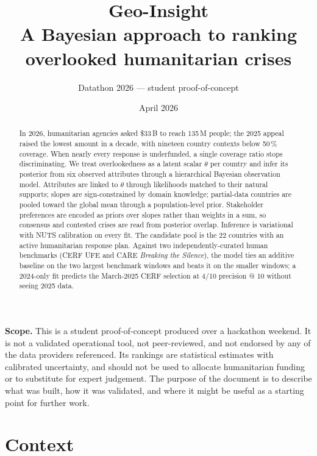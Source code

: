 \documentclass[11pt,a4paper]{article}
\title{\textbf{Geo-Insight}\\[0.25em]
  \normalsize\mdseries A Bayesian approach to ranking\\
  overlooked humanitarian crises}
\author{\small Datathon 2026 --- student proof-of-concept}
\date{\small April 2026}
\begin{document}
\maketitle

\vspace{-1.2em}
\begin{tcolorbox}[colback=yellow!8,colframe=yellow!40!black!55,boxrule=0.4pt,
  left=6pt,right=6pt,top=4pt,bottom=4pt]
\small
\textbf{Scope.} This is a student proof-of-concept produced over a hackathon
weekend. It is not a validated operational tool, not peer-reviewed, and not
endorsed by any of the data providers referenced. Its rankings are statistical
estimates with calibrated uncertainty, and should not be used to allocate
humanitarian funding or to substitute for expert judgement. The purpose of the
document is to describe what was built, how it was validated, and where it
might be useful as a starting point for further work.
\end{tcolorbox}

\begin{abstract}
\noindent
In 2026, humanitarian agencies asked \$33\,B to reach 135\,M people; the 2025
appeal raised the lowest amount in a decade, with nineteen country contexts
below 50\,\% coverage. When nearly every response is underfunded, a single
coverage ratio stops discriminating. We treat overlookedness as a latent
scalar $\theta$ per country and infer its posterior from six observed
attributes through a hierarchical Bayesian observation model. Attributes are
linked to $\theta$ through likelihoods matched to their natural supports;
slopes are sign-constrained by domain knowledge; partial-data countries are
pooled toward the global mean through a population-level prior. Stakeholder
preferences are encoded as priors over slopes rather than weights in a sum,
so consensus and contested crises are read from posterior overlap. Inference
is variational with NUTS calibration on every fit. The candidate pool is the
22 countries with an active humanitarian response plan. Against two
independently-curated human benchmarks (CERF UFE and CARE \emph{Breaking the
Silence}), the model ties an additive baseline on the two largest benchmark
windows and beats it on the smaller windows; a 2024-only fit predicts the
March-2025 CERF selection at 4/10 precision @ 10 without seeing 2025 data.
\end{abstract}

\section{Context}
\end{document}
